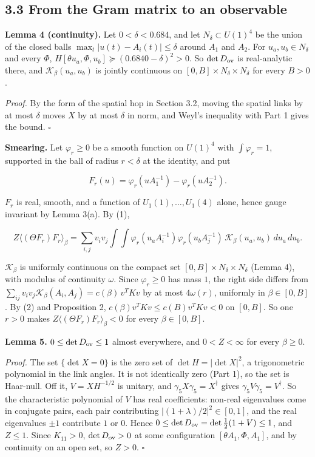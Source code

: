 \documentclass[11pt,a4paper]{article}
\begin{document}
\subsection*{3.3 From the Gram matrix to an observable}
{\bfseries\boldmath Lemma 4 (continuity).} Let $0<\delta<0.684$, and let $N_\delta\subset U(1)^4$ be the union of the closed balls $\max_t|u(t)-A_i(t)|\le\delta$ around $A_1$ and $A_2$. For $u_a,u_b\in N_\delta$ and every $\Phi$, $H[\theta u_a,\Phi,u_b]\succeq(0.6840-\delta)^2>0$. So $\det D_{\rm ov}$ is real-analytic there, and $\mathcal K_\beta(u_a,u_b)$ is jointly continuous on $[0,B]\times N_\delta\times N_\delta$ for every $B>0$.

\emph{Proof.} By the form of the spatial hop in Section 3.2, moving the spatial links by at most $\delta$ moves $X$ by at most $\delta$ in norm, and Weyl's inequality with Part 1 gives the bound. $\square$

{\bfseries\boldmath Smearing.} Let $\varphi_r\ge0$ be a smooth function on $U(1)^4$ with $\int\varphi_r=1$, supported in the ball of radius $r<\delta$ at the identity, and put


\begin{equation*}
F_r(u)=\varphi_r(uA_1^{-1})-\varphi_r(uA_2^{-1}).
\end{equation*}


$F_r$ is real, smooth, and a function of $U_1(1),\dots,U_1(4)$ alone, hence gauge invariant by Lemma 3(a). By (1),


\begin{equation*}
Z\langle(\Theta F_r)F_r\rangle_\beta=\sum_{i,j}v_iv_j\int\!\!\int\varphi_r(u_aA_i^{-1})\varphi_r(u_bA_j^{-1})\,\mathcal K_\beta(u_a,u_b)\,du_a\,du_b.
\end{equation*}


$\mathcal K_\beta$ is uniformly continuous on the compact set $[0,B]\times N_\delta\times N_\delta$ (Lemma 4), with modulus of continuity $\omega$. Since $\varphi_r\ge0$ has mass $1$, the right side differs from $\sum_{ij}v_iv_j\mathcal K_\beta(A_i,A_j)=c(\beta)\,v^TKv$ by at most $4\omega(r)$, uniformly in $\beta\in[0,B]$. By (2) and Proposition 2, $c(\beta)v^TKv\le c(B)v^TKv<0$ on $[0,B]$. So one $r>0$ makes $Z\langle(\Theta F_r)F_r\rangle_\beta<0$ for every $\beta\in[0,B]$.

{\bfseries\boldmath Lemma 5.} $0\le\det D_{\rm ov}\le1$ almost everywhere, and $0<Z<\infty$ for every $\beta\ge0$.

\emph{Proof.} The set $\{\det X=0\}$ is the zero set of $\det H=|\det X|^2$, a trigonometric polynomial in the link angles. It is not identically zero (Part 1), so the set is Haar-null. Off it, $V=XH^{-1/2}$ is unitary, and $\gamma_5X\gamma_5=X^\dagger$ gives $\gamma_5V\gamma_5=V^\dagger$. So the characteristic polynomial of $V$ has real coefficients: non-real eigenvalues come in conjugate pairs, each pair contributing $|(1+\lambda)/2|^2\in[0,1]$, and the real eigenvalues $\pm1$ contribute $1$ or $0$. Hence $0\le\det D_{\rm ov}=\det\tfrac12(1+V)\le1$, and $Z\le1$. Since $K_{11}>0$, $\det D_{\rm ov}>0$ at some configuration $[\theta A_1,\Phi,A_1]$, and by continuity on an open set, so $Z>0$. $\square$
\end{document}
